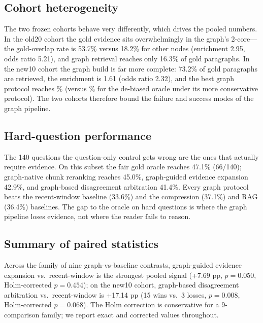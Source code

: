 \documentclass{article}
\newcommand{\pp}{\ensuremath{\,\mathrm{pp}}}
\begin{document}
\subsection{Cohort heterogeneity}
\label{sec:heterogeneity}

The two frozen cohorts behave very differently, which drives the pooled numbers.
In the old20 cohort the gold evidence sits overwhelmingly in the graph's
2-core---the gold-overlap rate is 53.7\% versus 18.2\% for other nodes
(enrichment 2.95, odds ratio 5.21), and graph retrieval reaches only 16.3\% of
gold paragraphs. In the new10 cohort the graph build is far more complete:
73.2\% of gold paragraphs are retrieved, the enrichment is 1.61 (odds ratio
2.32), and the best graph protocol reaches \GraphArbitrationNewTen\%
(versus \GoldNewTen\% for the de-biased oracle under its more conservative
protocol). The two cohorts therefore bound the failure and success modes of the
graph pipeline.

\subsection{Hard-question performance}
\label{sec:q0hard}

The 140 questions the question-only control gets wrong are the ones that
actually require evidence. On this subset the fair gold oracle reaches 47.1\%
(66/140); graph-native chunk reranking reaches 45.0\%, graph-guided evidence
expansion 42.9\%, and graph-based disagreement arbitration 41.4\%. Every graph
protocol beats the recent-window baseline (33.6\%) and the compression (37.1\%)
and RAG (36.4\%) baselines. The gap to the oracle on hard questions is where the
graph pipeline loses evidence, not where the reader fails to reason.

\subsection{Summary of paired statistics}
\label{sec:stats}

Across the family of nine graph-vs-baseline contrasts, graph-guided evidence
expansion vs.\ recent-window is the strongest pooled signal
(+7.69\,\pp, $p=0.050$, Holm-corrected $p=0.454$); on the new10 cohort,
graph-based disagreement arbitration vs.\ recent-window is +17.14\,\pp
(15 wins vs.\ 3 losses, $p=0.008$, Holm-corrected $p=0.068$). The Holm
correction is conservative for a 9-comparison family; we report exact and
corrected values throughout.

\end{document}
